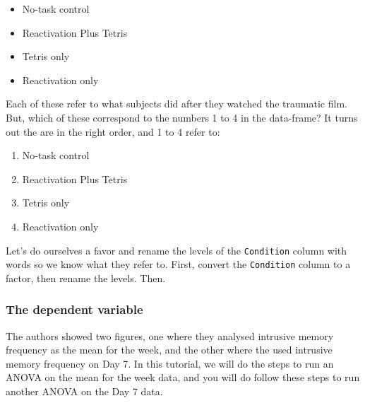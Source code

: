 \documentclass[
]{book}
\newenvironment{Shaded}{\begin{snugshade}}{\end{snugshade}}
\newcommand{\FunctionTok}[1]{\textcolor[rgb]{0.13,0.29,0.53}{\textbf{#1}}}
\newcommand{\NormalTok}[1]{#1}
\newcommand{\OtherTok}[1]{\textcolor[rgb]{0.56,0.35,0.01}{#1}}
\newcommand{\SpecialCharTok}[1]{\textcolor[rgb]{0.81,0.36,0.00}{\textbf{#1}}}
\newcommand{\StringTok}[1]{\textcolor[rgb]{0.31,0.60,0.02}{#1}}
\providecommand{\tightlist}{%
  \setlength{\itemsep}{0pt}\setlength{\parskip}{0pt}}
\begin{document}
\begin{itemize}
\tightlist
\item
  No-task control
\item
  Reactivation Plus Tetris
\item
  Tetris only
\item
  Reactivation only
\end{itemize}

Each of these refer to what subjects did after they watched the traumatic film. But, which of these correspond to the numbers 1 to 4 in the data-frame? It turns out the are in the right order, and 1 to 4 refer to:

\begin{enumerate}
\def\labelenumi{\arabic{enumi}.}
\tightlist
\item
  No-task control
\item
  Reactivation Plus Tetris
\item
  Tetris only
\item
  Reactivation only
\end{enumerate}

Let's do ourselves a favor and rename the levels of the \texttt{Condition} column with words so we know what they refer to. First, convert the \texttt{Condition} column to a factor, then rename the levels. Then.

\begin{Shaded}
\end{Shaded}

\hypertarget{the-dependent-variable}{%
\subsubsection{The dependent variable}\label{the-dependent-variable}}

The authors showed two figures, one where they analysed intrusive memory frequency as the mean for the week, and the other where the used intrusive memory frequency on Day 7. In this tutorial, we will do the steps to run an ANOVA on the mean for the week data, and you will do follow these steps to run another ANOVA on the Day 7 data.
\end{document}
